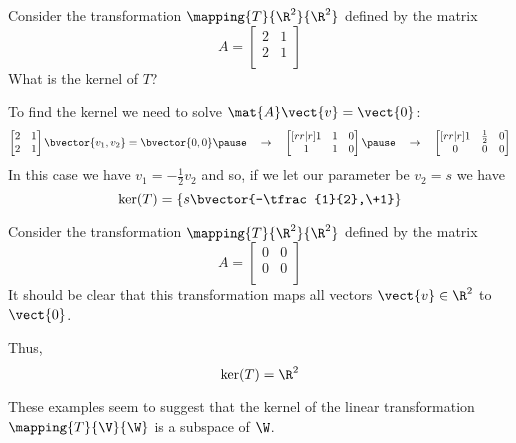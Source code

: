 \documentclass{beamer}
\begin{document}
\begin{frame}
\begin{example}
Consider the transformation $\mapping{T}{\R^2}{\R^2}$ defined by the matrix
\begin{equation*}A=
\begin{bmatrix}
2 & 1 \\
2 & 1 \\
\end{bmatrix}
\end{equation*}
What is the kernel of $T$?\pause

\vspace{2mm}
To find the kernel we need to solve $\mat{A}\vect{v}=\vect{0}$:
\begin{equation*}
\begin{bmatrix}
2 & 1 \\
2 & 1 \\
\end{bmatrix}
\bvector{v_1,v_2}=\bvector{0,0}
\pause\quad\rightarrow\quad
\begin{bmatrix}[rr|r]
1 & 1 & 0 \\
1 & 1 & 0 \\
\end{bmatrix}
\pause\quad\rightarrow\quad
\begin{bmatrix}[rr|r]
1 & \tfrac{1}{2} & 0 \\
0 & 0 & 0 \\
\end{bmatrix}
\end{equation*}\pause
In this case we have $v_1=-\tfrac{1}{2}v_2$ and so, if we let our parameter be $v_2=s$ we have
\begin{equation*}
\ker(T)=\left\{s\bvector{-\tfrac{1}{2},\+1}\right\}
\end{equation*}
\end{example}
\end{frame}

\begin{frame}
\begin{example}
Consider the transformation $\mapping{T}{\R^2}{\R^2}$ defined by the matrix
\begin{equation*}A=
\begin{bmatrix}
0 & 0 \\
0 & 0 \\
\end{bmatrix}
\end{equation*}\pause
It should be clear that this transformation maps all vectors $\vect{v}\in\R^2$ to $\vect{0}$.\pause

\vspace{2mm}
Thus,
\begin{equation*}
\ker(T)=\R^2
\end{equation*}
\end{example}\pause
\begin{block}{}
These examples seem to suggest that the kernel of the linear transformation $\mapping{T}{\V}{\W}$ is a subspace of $\W$.
\end{block}
\end{frame}
\end{document}
